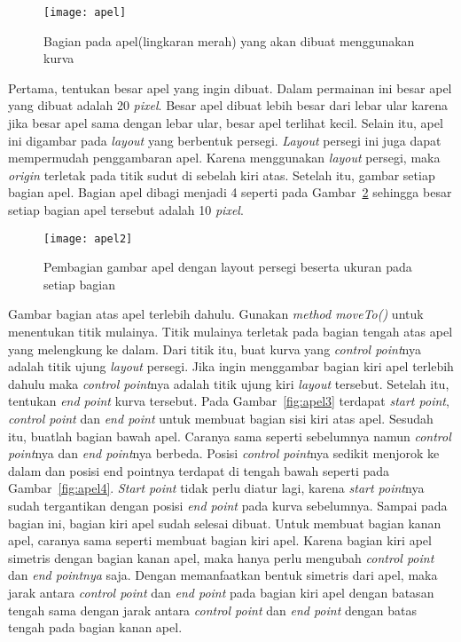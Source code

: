 \begin{figure}[H]
	\centering  
	\texttt{[image: apel]}  
	\caption[Bagian pada apel(lingkaran merah) yang akan dibuat menggunakan kurva]{Bagian pada apel(lingkaran merah) yang akan dibuat menggunakan kurva}
	\label{fig:apel} 
\end{figure}

Pertama, tentukan besar apel yang ingin dibuat. Dalam permainan ini besar apel yang dibuat adalah 20 \textit{pixel}. Besar apel dibuat lebih besar dari lebar ular karena jika besar apel sama dengan lebar ular, besar apel terlihat kecil. Selain itu, apel ini digambar pada \textit{layout} yang berbentuk persegi. \textit{Layout} persegi ini juga dapat mempermudah penggambaran apel. Karena menggunakan \textit{layout} persegi, maka \textit{origin} terletak pada titik sudut di sebelah kiri atas. Setelah itu, gambar setiap bagian apel. Bagian apel dibagi menjadi 4 seperti pada Gambar~\ref{fig:apel2} sehingga besar setiap bagian apel tersebut adalah 10 \textit{pixel}. 

\begin{figure}[H]
	\centering  
	\texttt{[image: apel2]}  
	\caption[Pembagian gambar apel dengan layout persegi beserta ukuran pada setiap bagian]{Pembagian gambar apel dengan layout persegi beserta ukuran pada setiap bagian}
	\label{fig:apel2} 
\end{figure}

Gambar bagian atas apel terlebih dahulu. Gunakan \textit{method moveTo()} untuk menentukan titik mulainya. Titik mulainya terletak pada bagian tengah atas apel yang melengkung ke dalam. Dari titik itu, buat kurva yang \textit{control point}nya adalah titik ujung \textit{layout} persegi. Jika ingin menggambar bagian kiri apel terlebih dahulu maka \textit{control point}nya adalah titik ujung kiri \textit{layout} tersebut. Setelah itu, tentukan \textit{end point} kurva tersebut. Pada Gambar~\ref{fig:apel3} terdapat \textit{start point}, \textit{control point} dan \textit{end point} untuk membuat bagian sisi kiri atas apel. Sesudah itu, buatlah bagian bawah apel. Caranya sama seperti sebelumnya namun \textit{control point}nya dan \textit{end point}nya berbeda. Posisi \textit{control point}nya sedikit menjorok ke dalam dan posisi end pointnya terdapat di tengah bawah seperti pada Gambar~\ref{fig:apel4}. \textit{Start point} tidak perlu diatur lagi, karena \textit{start point}nya sudah tergantikan dengan posisi \textit{end point} pada kurva sebelumnya. Sampai pada bagian ini, bagian kiri apel sudah selesai dibuat. Untuk membuat bagian kanan apel, caranya sama seperti membuat bagian kiri apel. Karena bagian kiri apel simetris dengan bagian kanan apel, maka hanya perlu mengubah \textit{control point} dan \textit{end pointnya} saja. Dengan memanfaatkan bentuk simetris dari apel, maka jarak antara \textit{control point} dan \textit{end point} pada bagian kiri apel dengan batasan tengah sama dengan jarak antara \textit{control point} dan \textit{end point} dengan batas tengah pada bagian kanan apel. 

